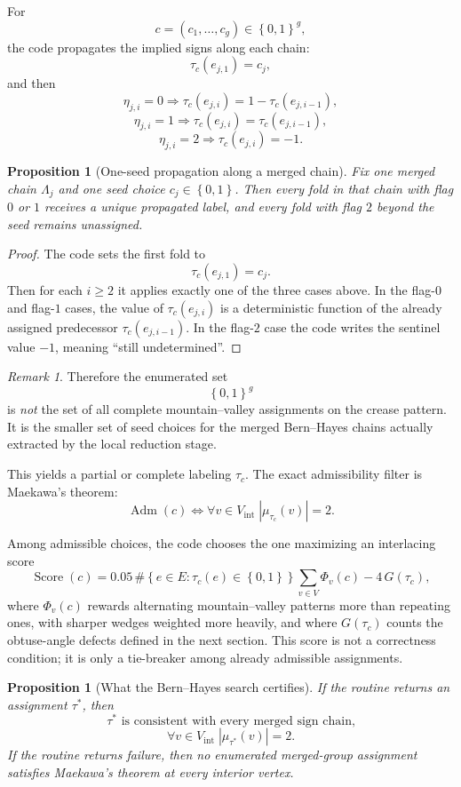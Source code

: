 \documentclass[11pt]{article}
\newtheorem{proposition}[definition]{Proposition}
\theoremstyle{remark}
\newtheorem{remark}[definition]{Remark}
\newcommand{\abs}[1]{\left\lvert #1 \right\rvert}
\newcommand{\set}[1]{\left\{ #1 \right\}}
\begin{document}
For
\[
c=(c_1,\dots,c_g)\in\set{0,1}^g,
\]
the code propagates the implied signs along each chain:
\[
\tau_c(e_{j,1})=c_j,
\]
and then
\[
\eta_{j,i}=0 \Longrightarrow \tau_c(e_{j,i})=1-\tau_c(e_{j,i-1}),
\]
\[
\eta_{j,i}=1 \Longrightarrow \tau_c(e_{j,i})=\tau_c(e_{j,i-1}),
\]
\[
\eta_{j,i}=2 \Longrightarrow \tau_c(e_{j,i})=-1.
\]

\begin{proposition}[One-seed propagation along a merged chain]
Fix one merged chain $\Lambda_j$ and one seed choice $c_j\in\set{0,1}$. Then
every fold in that chain with flag $0$ or $1$ receives a unique propagated
label, and every fold with flag $2$ beyond the seed remains unassigned.
\end{proposition}

\begin{proof}
The code sets the first fold to
\[
\tau_c(e_{j,1})=c_j.
\]
Then for each $i\ge2$ it applies exactly one of the three cases above. In the
flag-$0$ and flag-$1$ cases, the value of $\tau_c(e_{j,i})$ is a deterministic
function of the already assigned predecessor $\tau_c(e_{j,i-1})$. In the
flag-$2$ case the code writes the sentinel value $-1$, meaning ``still
undetermined''.
\end{proof}

\begin{remark}
Therefore the enumerated set
\[
\set{0,1}^g
\]
is \emph{not} the set of all complete mountain--valley assignments on the
crease pattern. It is the smaller set of seed choices for the merged
Bern--Hayes chains actually extracted by the local reduction stage.
\end{remark}

This yields a partial or complete labeling $\tau_c$. The exact admissibility
filter is Maekawa's theorem:
\[
\operatorname{Adm}(c)
\Longleftrightarrow
\forall v\in V_{\mathrm{int}}\;
\abs{\mu_{\tau_c}(v)}=2.
\]

Among admissible choices, the code chooses the one maximizing an interlacing
score
\[
\operatorname{Score}(c)
=
0.05\,\#\set{e\in E:\tau_c(e)\in\set{0,1}}
\sum_{v\in V}\Phi_v(c)-4\,G(\tau_c),
\]
where $\Phi_v(c)$ rewards alternating mountain--valley patterns more than
repeating ones, with sharper wedges weighted more heavily, and where
$G(\tau_c)$ counts the obtuse-angle defects defined in the next section. This
score is not a correctness condition; it is only a tie-breaker among already
admissible assignments.

\begin{proposition}[What the Bern--Hayes search certifies]
If the routine returns an assignment $\tau^\ast$, then
\[
\tau^\ast\text{ is consistent with every merged sign chain,}
\]
\[
\forall v\in V_{\mathrm{int}}\;
\abs{\mu_{\tau^\ast}(v)}=2.
\]
If the routine returns failure, then no enumerated merged-group assignment
satisfies Maekawa's theorem at every interior vertex.
\end{proposition}
\end{document}

